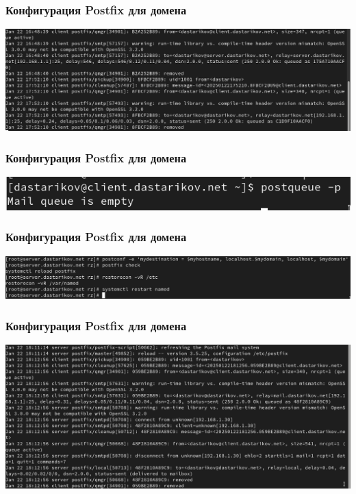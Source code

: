 \begin{frame}
\frametitle{Конфигурация Postfix для домена}
    \centering
    \includegraphics[width=\textwidth]{../images/image21.png}
\end{frame}
\begin{frame}
\frametitle{Конфигурация Postfix для домена}
    \centering
    \includegraphics[width=\textwidth]{../images/image22.png}
\end{frame}
\begin{frame}
\frametitle{Конфигурация Postfix для домена}
    \centering
    \includegraphics[width=\textwidth]{../images/image25.png}
\end{frame}
\begin{frame}
\frametitle{Конфигурация Postfix для домена}
    \centering
    \includegraphics[width=\textwidth]{../images/image26.png}
\end{frame}
